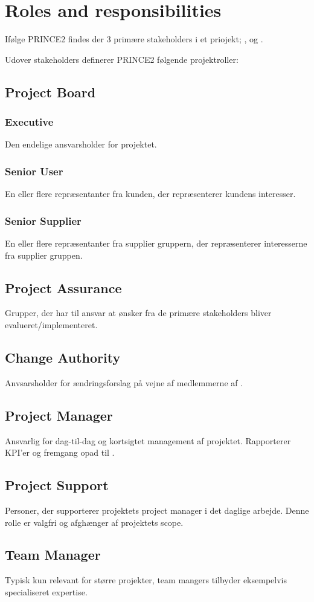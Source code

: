 \chapter{Roles and responsibilities}
Ifølge PRINCE2 findes der 3 primære stakeholders i et priojekt; ,  og .

Udover stakeholders definerer PRINCE2 følgende projektroller:

\section{Project Board}
\label{sec:project_board}

\subsection{Executive}
Den endelige ansvarsholder for projektet.

\subsection{Senior User}
En eller flere repræsentanter fra kunden, der repræsenterer kundens interesser.

\subsection{Senior Supplier}
En eller flere repræsentanter fra supplier gruppern, der repræsenterer interesserne fra supplier gruppen.

\section{Project Assurance}
Grupper, der har til ansvar at ønsker fra de primære stakeholders bliver evalueret/implementeret.

\section{Change Authority}
Anvsarsholder for ændringsforslag på vejne af medlemmerne af .

\section{Project Manager}
Ansvarlig for dag-til-dag og kortsigtet management af projektet. Rapporterer KPI'er og fremgang opad til .

\section{Project Support}
Personer, der supporterer projektets project manager i det daglige arbejde. Denne rolle er valgfri og afghænger af projektets scope.

\section{Team Manager}
Typisk kun relevant for større projekter, team mangers tilbyder eksempelvis specialiseret expertise.
